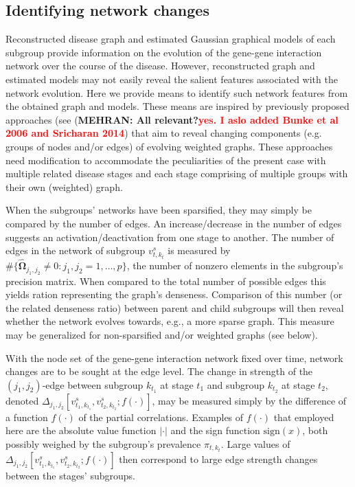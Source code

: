 \documentclass[10pt]{article}
\newcommand{\red}[1]{{\textcolor {red} {#1}}}
\begin{document}
\subsection{Identifying network changes} \label{topology}
Reconstructed disease graph and estimated Gaussian graphical models of each subgroup provide information on the evolution of the gene-gene interaction network over the course of the disease. However, reconstructed graph and estimated models may not easily reveal the salient features associated with the network evolution. Here we provide means to identify such network features from the obtained graph and models. These means are inspired by previously proposed approaches (see \citet{bunke2006,muthukrishnan2010edge,berlingerio2009mining,akoglu2010oddball,liu2008spotting,aggarwal2014evolutionary,sricharan2014} (\textbf{MEHRAN: All relevant?\red{yes. I aslo added Bunke et al 2006 and Sricharan 2014}}) that aim to reveal changing components (e.g. groups of nodes and/or edges) of evolving weighted graphs. These approaches need modification to accommodate the peculiarities of the present case with multiple related disease stages and each stage comprising of multiple groups with their own (weighted) graph.

When the subgroups' networks have been sparsified, they may simply be compared by the number of edges. An increase/decrease in the number of edges suggests an activation/deactivation from one stage to another. The number of edges in the network of subgroup $v^s_{t, k_t}$ is measured by $\# \{ \widehat{\mathbf{\Omega}}_{j_1, j_2} \not= 0 : j_1, j_2 =1, \ldots, p \}$, the number of nonzero elements in the subgroup's precision matrix. When compared to the total number of possible edges this yields ration representing the graph's denseness. Comparison of this number (or the related denseness ratio) between parent and child subgroups will then reveal whether the network evolves towards, e.g., a more sparse graph. This measure may be generalized for non-sparsified and/or weighted graphs (see below). 

With the node set of the gene-gene interaction network fixed over time, network changes are to be sought at the edge level. The change in strength of the $(j_1, j_2)$-edge between subgroup $k_{t_1}$ at stage $t_1$ and subgroup $k_{t_2}$ at stage $t_2$, denoted $\Delta_{j_1,j_2} [v^s_{t_1, k_{t_1}}, v^s_{t_2, k_{t_2}}; f(\cdot)]$, may be measured simply by the difference of a function $f(\cdot)$ of the partial correlations. Examples of $f(\cdot)$ that employed here are the absolute value function $| \cdot |$ and the sign function $\mbox{sign}(x)$, both possibly weighed by the subgroup's prevalence $\pi_{t,k_t}$. Large values of $\Delta_{j_1,j_2} [v^s_{t_1, k_{t_1}}, v^s_{t_2, k_{t_2}}; f(\cdot)]$ then correspond to large edge strength changes between the stages' subgroups.
\end{document}
